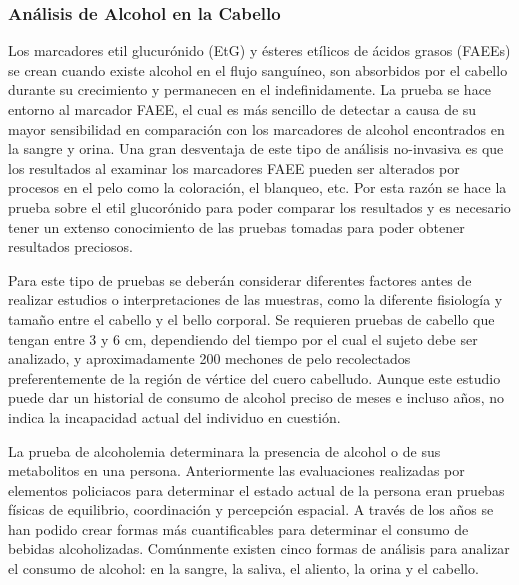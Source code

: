 \subsubsection{Análisis de Alcohol en la Cabello}
Los marcadores etil glucurónido (EtG) y ésteres etílicos de ácidos grasos (FAEEs) se crean cuando existe alcohol en el flujo sanguíneo, son absorbidos por el cabello durante su crecimiento y permanecen en el indefinidamente. La prueba se hace entorno al marcador FAEE, el cual es más sencillo de detectar a causa de su mayor sensibilidad en comparación con los marcadores de alcohol encontrados en la sangre y orina. Una gran desventaja de este tipo de análisis no-invasiva es que los resultados al examinar los marcadores FAEE pueden ser alterados por procesos en el pelo como la coloración, el blanqueo, etc. Por esta razón se hace la prueba sobre el etil glucorónido para poder comparar los resultados y es necesario tener un extenso conocimiento de las pruebas tomadas para poder obtener resultados preciosos. \par
Para este tipo de pruebas se deberán considerar diferentes factores antes de realizar estudios o interpretaciones de las muestras, como la diferente fisiología y tamaño entre el cabello y el bello corporal. Se requieren pruebas de cabello que tengan entre 3 y 6 cm, dependiendo del tiempo por el cual el sujeto debe ser analizado, y aproximadamente 200 mechones de pelo recolectados preferentemente de la región de vértice del cuero cabelludo. Aunque este estudio puede dar un historial de consumo de alcohol preciso de meses e incluso años, no indica la incapacidad actual del individuo en cuestión.\par
La prueba de alcoholemia determinara la presencia de alcohol o de sus metabolitos en una persona. Anteriormente las evaluaciones realizadas por elementos policiacos para determinar el estado actual de la persona eran pruebas físicas de equilibrio, coordinación y percepción espacial.  A través de los años se han podido crear formas más cuantificables para determinar el consumo de bebidas alcoholizadas. Comúnmente existen cinco formas de análisis para analizar el consumo de alcohol: en la sangre, la saliva, el aliento, la orina y el cabello.